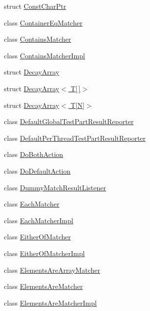 \begin{DoxyCompactItemize}
\item 
struct \hyperlink{structtesting_1_1internal_1_1ConstCharPtr}{Const\+Char\+Ptr}
\item 
class \hyperlink{classtesting_1_1internal_1_1ContainerEqMatcher}{Container\+Eq\+Matcher}
\item 
class \hyperlink{classtesting_1_1internal_1_1ContainsMatcher}{Contains\+Matcher}
\item 
class \hyperlink{classtesting_1_1internal_1_1ContainsMatcherImpl}{Contains\+Matcher\+Impl}
\item 
struct \hyperlink{structtesting_1_1internal_1_1DecayArray}{Decay\+Array}
\item 
struct \hyperlink{structtesting_1_1internal_1_1DecayArray_3_01T[]_4}{Decay\+Array$<$ T\mbox{[}$\,$\mbox{]}$>$}
\item 
struct \hyperlink{structtesting_1_1internal_1_1DecayArray_3_01T[N]_4}{Decay\+Array$<$ T\mbox{[}\+N\mbox{]}$>$}
\item 
class \hyperlink{classtesting_1_1internal_1_1DefaultGlobalTestPartResultReporter}{Default\+Global\+Test\+Part\+Result\+Reporter}
\item 
class \hyperlink{classtesting_1_1internal_1_1DefaultPerThreadTestPartResultReporter}{Default\+Per\+Thread\+Test\+Part\+Result\+Reporter}
\item 
class \hyperlink{classtesting_1_1internal_1_1DoBothAction}{Do\+Both\+Action}
\item 
class \hyperlink{classtesting_1_1internal_1_1DoDefaultAction}{Do\+Default\+Action}
\item 
class \hyperlink{classtesting_1_1internal_1_1DummyMatchResultListener}{Dummy\+Match\+Result\+Listener}
\item 
class \hyperlink{classtesting_1_1internal_1_1EachMatcher}{Each\+Matcher}
\item 
class \hyperlink{classtesting_1_1internal_1_1EachMatcherImpl}{Each\+Matcher\+Impl}
\item 
class \hyperlink{classtesting_1_1internal_1_1EitherOfMatcher}{Either\+Of\+Matcher}
\item 
class \hyperlink{classtesting_1_1internal_1_1EitherOfMatcherImpl}{Either\+Of\+Matcher\+Impl}
\item 
class \hyperlink{classtesting_1_1internal_1_1ElementsAreArrayMatcher}{Elements\+Are\+Array\+Matcher}
\item 
class \hyperlink{classtesting_1_1internal_1_1ElementsAreMatcher}{Elements\+Are\+Matcher}
\item 
class \hyperlink{classtesting_1_1internal_1_1ElementsAreMatcherImpl}{Elements\+Are\+Matcher\+Impl}

\end{DoxyCompactItemize}
